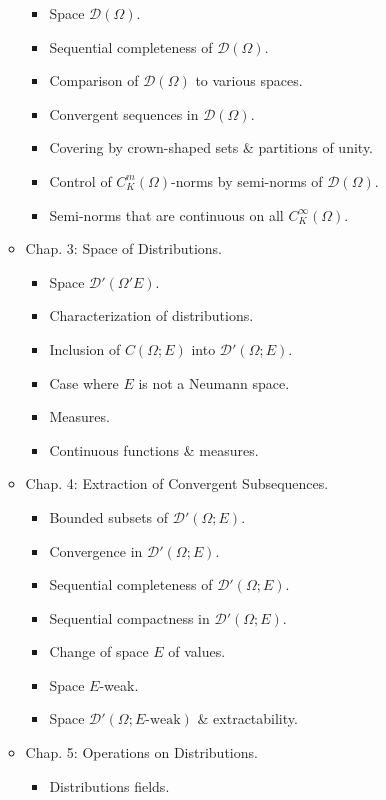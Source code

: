 \documentclass{article}
\begin{document}
\begin{enumerate}
\begin{itemize}
\begin{itemize}
			\item {\sf Space $\mathcal{D}(\Omega)$.}
			\item {\sf Sequential completeness of $\mathcal{D}(\Omega)$.}
			\item {\sf Comparison of $\mathcal{D}(\Omega)$ to various spaces.}
			\item {\sf Convergent sequences in $\mathcal{D}(\Omega)$.}
			\item {\sf Covering by crown-shaped sets \& partitions of unity.}
			\item {\sf Control of $C_K^m(\Omega)$-norms by semi-norms of $\mathcal{D}(\Omega)$.}
			\item {\sf Semi-norms that are continuous on all $C_K^\infty(\Omega)$.}
		\end{itemize}
		\item {\sf Chap. 3: Space of Distributions.}
		\begin{itemize}
			\item {\sf Space $\mathcal{D}'(\Omega'E)$.}
			\item {\sf Characterization of distributions.}
			\item {\sf Inclusion of $C(\Omega;E)$ into $\mathcal{D}'(\Omega;E)$.}
			\item {\sf Case where $E$ is not a Neumann space.}
			\item {\sf Measures.}
			\item {\sf Continuous functions \& measures.}
		\end{itemize}
		\item {\sf Chap. 4: Extraction of Convergent Subsequences.}
		\begin{itemize}
			\item {\sf Bounded subsets of $\mathcal{D}'(\Omega;E)$.}
			\item {\sf Convergence in $\mathcal{D}'(\Omega;E)$.}
			\item {\sf Sequential completeness of $\mathcal{D}'(\Omega;E)$.}
			\item {\sf Sequential compactness in $\mathcal{D}'(\Omega;E)$.}
			\item {\sf Change of space $E$ of values.}
			\item {\sf Space $E$-weak.}
			\item {\sf Space $\mathcal{D}'(\Omega;E\mbox{-weak})$ \& extractability.}
		\end{itemize}
		\item {\sf Chap. 5: Operations on Distributions.}
		\begin{itemize}
			\item {\sf Distributions fields.}

\end{itemize}
\end{itemize}
\end{enumerate}
\end{document}
